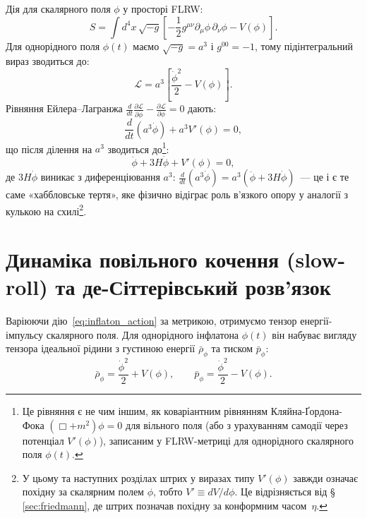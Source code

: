 Дія для скалярного поля $\phi$ у просторі FLRW:
\begin{equation}\label{eq:inflaton_action}
  S = \int d^4x\,\sqrt{-g}\left[-\frac{1}{2}g^{\mu\nu}\partial_\mu\phi\,\partial_\nu\phi - V(\phi)\right].
\end{equation}
Для однорідного поля $\phi(t)$ маємо $\sqrt{-g} = a^3$ і $g^{00} = -1$,
тому підінтегральний вираз зводиться до:
\begin{equation*}
  \mathcal{L} = a^3\!\left[\frac{\dot{\phi}^2}{2} - V(\phi)\right].
\end{equation*}
Рівняння Ейлера--Лагранжа $\frac{d}{dt}\frac{\partial\mathcal{L}}{\partial\dot{\phi}} - \frac{\partial\mathcal{L}}{\partial\phi} = 0$ дають:
\begin{equation*}
  \frac{d}{dt}\!\left(a^3\dot{\phi}\right) + a^3 V'(\phi) = 0,
\end{equation*}
що після ділення на $a^3$ зводиться до\footnote{Це рівняння є не чим іншим, як коваріантним рівнянням Кляйна-Ґордона-Фока $\left(\Box + m^2\right)\phi = 0$ для вільного поля (або з урахуванням самодії через потенціал $V'(\phi)$), записаним у FLRW-метриці для однорідного скалярного поля $\phi(t)$.}:
\begin{equation}\label{eq:klein_gordon}
    \ddot{\phi} +3H\dot{\phi} + V'(\phi) = 0,
\end{equation}
де $3H\dot{\phi}$ виникає з диференціювання $a^3$:
$\frac{d}{dt}(a^3\dot{\phi}) = a^3(\ddot{\phi} + 3H\dot{\phi})$~---
це і є те саме «хаббловське тертя», яке фізично відіграє роль
в'язкого опору у аналогії з кулькою на схилі\footnote{У цьому та наступних розділах
штрих у виразах типу $V'(\phi)$ завжди означає похідну за
скалярним полем $\phi$, тобто $V' \equiv dV/d\phi$. Це відрізняється
від §\,\ref{sec:friedmann}, де штрих позначав похідну за конформним
часом~$\eta$.}.

\section{Динаміка повільного кочення (slow-roll) та де-Сіт\-те\-рів\-ський розв'язок}
\label{subsec:slowroll_dynamics}

Варіюючи дію~\eqref{eq:inflaton_action} за метрикою, отримуємо тензор енергії-імпульсу скалярного поля. Для однорідного інфлатона $\phi(t)$ він набуває вигляду тензора ідеальної рідини з густиною енергії $\bar{\rho}_\phi$ та тиском $\bar{p}_\phi$:
\begin{equation}\label{eq:inflaton_rho_p}
  \bar{\rho}_\phi = \frac{\dot{\phi}^2}{2} + V(\phi),
  \qquad
  \bar{p}_\phi   = \frac{\dot{\phi}^2}{2} - V(\phi).
\end{equation}

